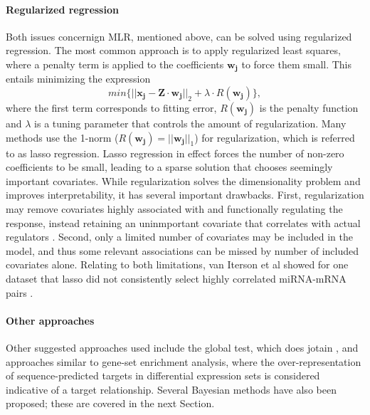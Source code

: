 \paragraph{Regularized regression}
Both issues concernign MLR, mentioned above, can be solved using regularized
regression. The most common approach is to apply regularized least squares,
where a penalty term is applied to the coefficients $\mathbf{w_j}$ to force
them small. This entails minimizing the expression
\begin{equation}
	min\{ || \mathbf{x_j} - \mathbf{Z} \cdot \mathbf{w_j} ||_2 + \lambda \cdot R(\mathbf{w_j}) \} ,
\end{equation}
where the first term corresponds to fitting error,
$R(\mathbf{w_j})$ is the penalty function and $\lambda$ is a tuning
parameter that controls the amount of regularization. 
Many methods use the 1-norm ($R(\mathbf{w_j}) = ||\mathbf{w_j}||_1$)
for regularization, which is referred to as lasso regression.
Lasso regression in effect forces the number of non-zero coefficients to be small,
leading to a sparse solution that chooses seemingly important covariates.
While regularization solves the dimensionality problem and improves
interpretability, it has several important drawbacks. First, regularization
may remove covariates highly associated with and functionally regulating the
response, instead retaining an uninmportant covariate that correlates with
actual regulators \citep{Engelmann2012}. Second, only a limited number of
covariates may be included in the model, and thus some relevant associations
can be missed by number of included covariates alone.%
Relating to both limitations, van Iterson et al showed for one dataset that
lasso did not consistently select highly correlated miRNA-mRNA pairs
\citep{vanIterson2013}.

\paragraph{Other approaches}
Other suggested approaches used include the global test, which does jotain
\citep{vanIterson2013}, and approaches similar to gene-set enrichment
analysis, where the over-representation of sequence-predicted targets in
differential expression sets is considered indicative of a target
relationship. Several Bayesian methods have also been proposed;
these are covered in the next Section.


